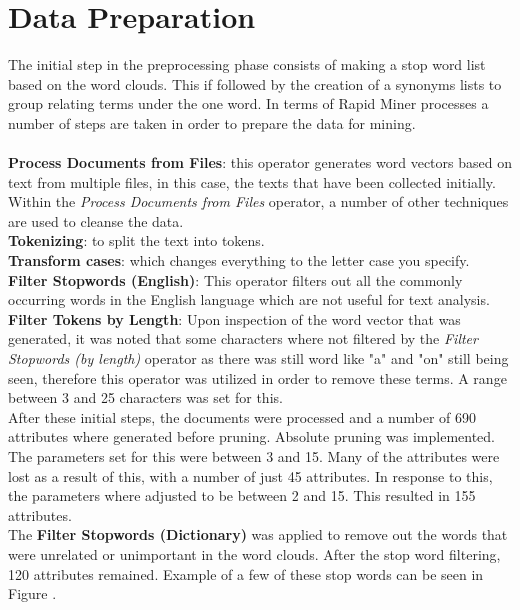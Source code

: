 \newpage

\newpage
\section*{Data Preparation}
The initial step in the preprocessing phase consists of making a stop word list based on the word clouds. This if followed by the creation of a synonyms lists to group relating terms under the one word. In terms of Rapid Miner processes a number of steps are taken in order to prepare the data for mining. \\ \\
\textbf{Process Documents from Files}: this operator generates word vectors based on text from multiple files, in this case, the texts that have been collected initially.  Within the \textit{Process Documents from Files} operator, a number of other techniques are used to cleanse the data.\\
\textbf{Tokenizing}: to split the text into tokens.\\ \textbf{Transform cases}: which changes everything to the letter case you specify.\\
\textbf{Filter Stopwords (English)}: This operator filters out all the commonly occurring words in the English language which are not useful for text analysis.\\
\textbf{Filter Tokens by Length}: Upon inspection of the word vector that was generated, it was noted that some characters where not filtered by the \textit{Filter Stopwords (by length)} operator as there was still word like "a" and "on" still being seen, therefore this operator was utilized in order to remove these terms. A range between 3 and 25 characters was set for this.\\

After these initial steps, the documents were processed and a number of 690 attributes where generated before pruning. Absolute pruning was implemented. The parameters set for this were between 3 and 15. Many of the attributes were lost as a result of this, with a number of just 45 attributes. In response to this, the parameters where adjusted to be between 2 and 15. This resulted in 155 attributes.\\
The \textbf{Filter Stopwords (Dictionary)} was applied to remove out the words that were unrelated or unimportant in the word clouds. After the stop word filtering, 120 attributes remained. Example of a few of these stop words can be seen in Figure .


